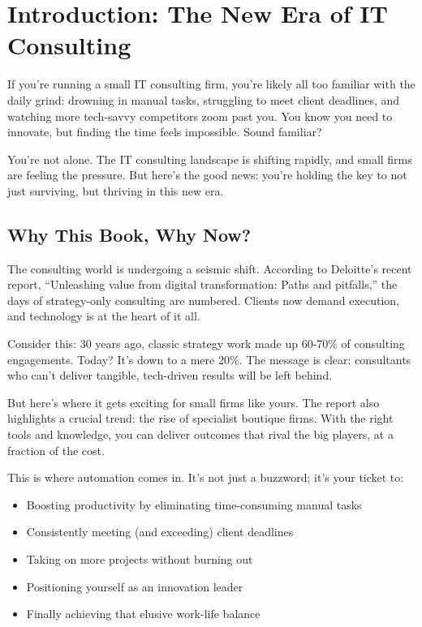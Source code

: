 \chapter*{Introduction: The New Era of IT Consulting}

If you're running a small IT consulting firm, you're likely all too familiar with the daily grind: drowning in manual tasks, struggling to meet client deadlines, and watching more tech-savvy competitors zoom past you. You know you need to innovate, but finding the time feels impossible. Sound familiar?

You're not alone. The IT consulting landscape is shifting rapidly, and small firms are feeling the pressure. But here's the good news: you're holding the key to not just surviving, but thriving in this new era.


\section{Why This Book, Why Now?}

The consulting world is undergoing a seismic shift. According to Deloitte's recent report, ``Unleashing value from digital transformation: Paths and pitfalls,'' the days of strategy-only consulting are numbered. Clients now demand execution, and technology is at the heart of it all.

Consider this: 30 years ago, classic strategy work made up 60-70\% of consulting engagements. Today? It's down to a mere 20\%. The message is clear: consultants who can't deliver tangible, tech-driven results will be left behind.

But here's where it gets exciting for small firms like yours. The report also highlights a crucial trend: the rise of specialist boutique firms. With the right tools and knowledge, you can deliver outcomes that rival the big players, at a fraction of the cost.

This is where automation comes in. It's not just a buzzword; it's your ticket to:
\begin{itemize}
    \item Boosting productivity by eliminating time-consuming manual tasks
    \item Consistently meeting (and exceeding) client deadlines
    \item Taking on more projects without burning out
    \item Positioning yourself as an innovation leader
    \item Finally achieving that elusive work-life balance
\end{itemize}


